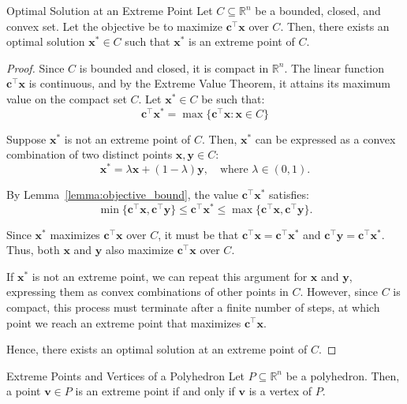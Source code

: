 \begin{theorem}{Optimal Solution at an Extreme Point}{}
\label{thm:extreme_point_optimum}
Let \(C \subseteq \mathbb{R}^n\) be a bounded, closed, and convex set. Let the objective be to maximize \(\mathbf{c}^\top \mathbf{x}\) over \(C\). Then, there exists an optimal solution \(\mathbf{x}^* \in C\) such that \(\mathbf{x}^*\) is an extreme point of \(C\).
\end{theorem}

\begin{proof}
Since \(C\) is bounded and closed, it is compact in \(\mathbb{R}^n\). The linear function \(\mathbf{c}^\top \mathbf{x}\) is continuous, and by the Extreme Value Theorem, it attains its maximum value on the compact set \(C\). Let \(\mathbf{x}^* \in C\) be such that:
\[
\mathbf{c}^\top \mathbf{x}^* = \max \{ \mathbf{c}^\top \mathbf{x} : {\mathbf{x} \in C} \}
\]

Suppose \(\mathbf{x}^*\) is not an extreme point of \(C\). Then, \(\mathbf{x}^*\) can be expressed as a convex combination of two distinct points \(\mathbf{x}, \mathbf{y} \in C\):
\[
\mathbf{x}^* = \lambda \mathbf{x} + (1-\lambda) \mathbf{y}, \quad \text{where } \lambda \in (0, 1).
\]

By Lemma~\ref{lemma:objective_bound}, the value \(\mathbf{c}^\top \mathbf{x}^*\) satisfies:
\[
\min\{\mathbf{c}^\top \mathbf{x}, \mathbf{c}^\top \mathbf{y}\} \leq \mathbf{c}^\top \mathbf{x}^* \leq \max\{\mathbf{c}^\top \mathbf{x}, \mathbf{c}^\top \mathbf{y}\}.
\]

Since \(\mathbf{x}^*\) maximizes \(\mathbf{c}^\top \mathbf{x}\) over \(C\), it must be that \(\mathbf{c}^\top \mathbf{x} = \mathbf{c}^\top \mathbf{x}^*\) and \(\mathbf{c}^\top \mathbf{y} = \mathbf{c}^\top \mathbf{x}^*\). Thus, both \(\mathbf{x}\) and \(\mathbf{y}\) also maximize \(\mathbf{c}^\top \mathbf{x}\) over \(C\).

If \(\mathbf{x}^*\) is not an extreme point, we can repeat this argument for \(\mathbf{x}\) and \(\mathbf{y}\), expressing them as convex combinations of other points in \(C\). However, since \(C\) is compact, this process must terminate after a finite number of steps, at which point we reach an extreme point that maximizes \(\mathbf{c}^\top \mathbf{x}\).

Hence, there exists an optimal solution at an extreme point of \(C\).
\end{proof}



\begin{theorem}{Extreme Points and Vertices of a Polyhedron}{}
Let \( P \subseteq \mathbb{R}^n \) be a polyhedron. Then, a point \( \mathbf{v} \in P \) is an extreme point if and only if \( \mathbf{v} \) is a vertex of \( P \).
\end{theorem}

